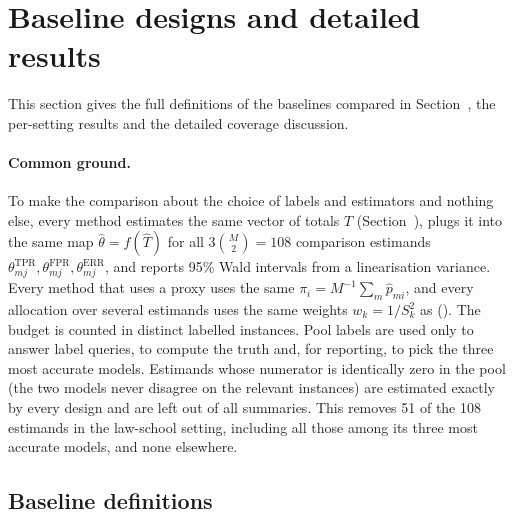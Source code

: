 \section{Baseline designs and detailed results}\label{si:baselines}

This section gives the full definitions of the baselines compared in Section~, the per-setting results and the detailed coverage discussion.

\paragraph{Common ground.} To make the comparison about the choice of labels and estimators and nothing else, every method estimates the same vector of totals $T$ (Section~), plugs it into the same map $\hat\theta=f(\hat T)$ for all $3\binom{M}{2}=108$ comparison estimands $\theta^{\mathrm{TPR}}_{mj},\theta^{\mathrm{FPR}}_{mj},\theta^{\mathrm{ERR}}_{mj}$, and reports 95\% Wald intervals from a linearisation variance. Every method that uses a proxy uses the same $\pi_i=M^{-1}\sum_m\hat p_{mi}$, and every allocation over several estimands uses the same weights $w_k=1/S_k^2$ as (). The budget is counted in distinct labelled instances. Pool labels are used only to answer label queries, to compute the truth and, for reporting, to pick the three most accurate models. Estimands whose numerator is identically zero in the pool (the two models never disagree on the relevant instances) are estimated exactly by every design and are left out of all summaries. This removes 51 of the 108 estimands in the law-school setting, including all those among its three most accurate models, and none elsewhere.

\subsection{Baseline definitions}


